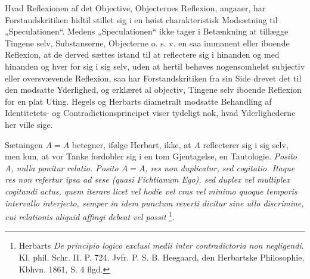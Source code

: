 \documentclass[11pt]{book}
\newcommand{\opage}[1]{\marginnote{\footnotesize\textit{[#1]}}}
\begin{document}
Hvad Reflexionen af det Objective, Objecternes Reflexion, angaaer, har Forstandskritiken hidtil stillet sig i en høist charakteristisk Modsætning til „Speculationen“. Medens „Speculationen“ ikke tager i Betænkning at tillægge Tingene selv, Substanserne, Objecterne o. s. v. en saa immanent eller iboende Reflexion, at de derved sættes istand til at reflectere sig i hinanden og med hinanden og hver for sig i sig selv, uden at hertil behøves nogensomhelst subjectiv eller oversvævende Reflexion, saa har Forstandskritiken fra sin Side drevet det til den modsatte Yderlighed, og erklæret al objectiv, Tingene selv iboende Reflexion for en plat Uting. Hegels og Herbarts diametralt modsatte Behandling af Identitetets- og Contradictionsprincipet viser tydeligt nok, hvad Yderlighederne her ville sige.

Sætningen $A = A$ betegner, ifølge Herbart, ikke, at $A$ reflecterer sig i sig selv, men kun, at vor Tanke fordobler sig i en tom Gjentagelse, en Tautologie. \textit{Posito A, nulla ponitur relatio. Posito $A = A$, res non duplicatur, sed cogitatio. Itaque res non refertur ipsa ad sese (quasi Fichtianum Ego), sed duplex vel multiplex cogitandi actus, quem iterare licet vel hodie vel cras vel minimo
\opage{72} \setcounter{footnote}{0}%
quoque temporis intervallo interjecto, semper in idem punctum reverti dicitur sine ullo discrimine, cui relationis aliquid affingi debeat vel possit}%
\footnote{Herbarts \textit{De principio logico exclusi medii inter contradictoria non negligendi}. Kl. phil. Schr. II. P. 724. Jvfr. P. S. B. Heegaard, den Herbartske Philosophie, Kbhvn. 1861, S. 4 flgd.}.
\end{document}
